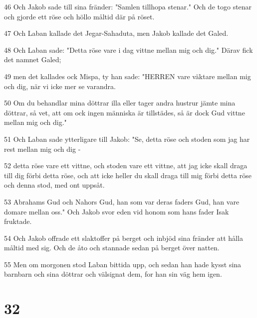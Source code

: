 \par 46 Och Jakob sade till sina fränder: "Samlen tillhopa stenar." Och de togo stenar och gjorde ett röse och höllo måltid där på röset.
\par 47 Och Laban kallade det Jegar-Sahaduta, men Jakob kallade det Galed.
\par 48 Och Laban sade: "Detta röse vare i dag vittne mellan mig och dig." Därav fick det namnet Galed;
\par 49 men det kallades ock Mispa, ty han sade: "HERREN vare väktare mellan mig och dig, när vi icke mer se varandra.
\par 50 Om du behandlar mina döttrar illa eller tager andra hustrur jämte mina döttrar, så vet, att om ock ingen människa är tillstädes, så är dock Gud vittne mellan mig och dig."
\par 51 Och Laban sade ytterligare till Jakob: "Se, detta röse och stoden som jag har rest mellan mig och dig -
\par 52 detta röse vare ett vittne, och stoden vare ett vittne, att jag icke skall draga till dig förbi detta röse, och att icke heller du skall draga till mig förbi detta röse och denna stod, med ont uppsåt.
\par 53 Abrahams Gud och Nahors Gud, han som var deras faders Gud, han vare domare mellan oss." Och Jakob svor eden vid honom som hans fader Isak fruktade.
\par 54 Och Jakob offrade ett slaktoffer på berget och inbjöd sina fränder att hålla måltid med sig. Och de åto och stannade sedan på berget över natten.
\par 55 Men om morgonen stod Laban bittida upp, och sedan han hade kysst sina barnbarn och sina döttrar och välsignat dem, for han sin väg hem igen.

\chapter{32}

